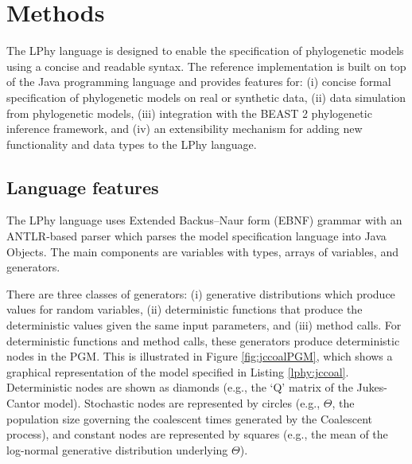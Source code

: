 \documentclass[10pt,letterpaper,table]{article}
\begin{document}
\section{Methods}
The LPhy language is designed to enable the specification of phylogenetic models using a concise and readable syntax.  
The reference implementation is built on top of the Java programming language and provides features for: 
(i) concise formal specification of phylogenetic models on real or synthetic data, (ii) data simulation from phylogenetic models, (iii) integration with the BEAST 2 phylogenetic inference framework, and (iv) an extensibility mechanism for adding new functionality and data types to the LPhy language.

\subsection{Language features}


The LPhy language uses Extended Backus–Naur form (EBNF) grammar with an ANTLR-based parser which parses the model specification language into Java Objects. 
The main components are variables with types, arrays of variables, and generators. 

There are three classes of generators: (i) generative distributions which produce values for random variables, (ii) deterministic functions that produce the deterministic values given the same input parameters, and (iii) method calls.
For deterministic functions and method calls, these generators produce deterministic nodes in the PGM.
This is illustrated in Figure \ref{fig:jccoalPGM}, which shows a graphical representation of the model specified in Listing \ref{lphy:jccoal}.
Deterministic nodes are shown as diamonds (e.g., the `Q' matrix of the Jukes-Cantor model).
Stochastic nodes are represented by circles (e.g., $\Theta$, the population size governing the coalescent times generated by the Coalescent process), and constant nodes are represented by squares (e.g., the mean of the log-normal generative distribution underlying $\Theta$). 
\end{document}

